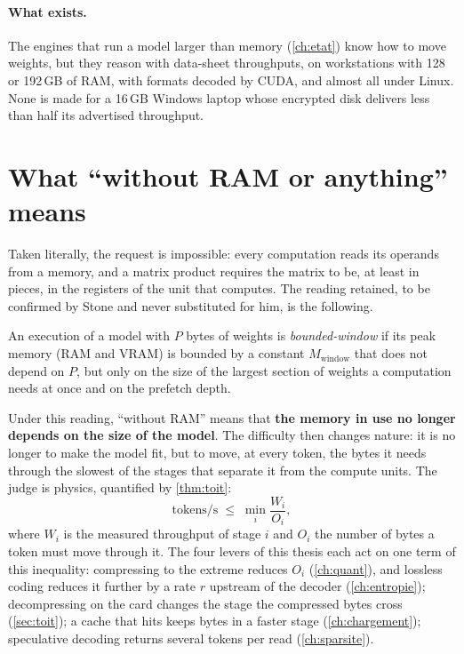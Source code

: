 \paragraph{What exists.} The engines that run a model larger than memory (\cref{ch:etat}) know how to move weights, but they reason with data-sheet throughputs, on workstations with 128 or 192\,GB of RAM, with formats decoded by CUDA, and almost all under Linux. None is made for a 16\,GB Windows laptop whose encrypted disk delivers less than half its advertised throughput.

\section{What \enquote{without RAM or anything} means}\label{sec:lecture}

Taken literally, the request is impossible: every computation reads its operands from a memory, and a matrix product requires the matrix to be, at least in pieces, in the registers of the unit that computes. The reading retained, to be confirmed by Stone and never substituted for him, is the following.

\begin{definition}\label{def:fenetre}
An execution of a model with $P$ bytes of weights is \emph{bounded-window} if its peak memory (RAM and VRAM) is bounded by a constant $M_{\text{window}}$ that does not depend on $P$, but only on the size of the largest section of weights a computation needs at once and on the prefetch depth.
\end{definition}

Under this reading, \enquote{without RAM} means that \textbf{the memory in use no longer depends on the size of the model}. The difficulty then changes nature: it is no longer to make the model fit, but to move, at every token, the bytes it needs through the slowest of the stages that separate it from the compute units. The judge is physics, quantified by \cref{thm:toit}:
\[
\text{tokens/s} \;\le\; \min_i \frac{W_i}{O_i},
\]
where $W_i$ is the measured throughput of stage $i$ and $O_i$ the number of bytes a token must move through it. The four levers of this thesis each act on one term of this inequality: compressing to the extreme reduces $O_i$ (\cref{ch:quant}), and lossless coding reduces it further by a rate $r$ upstream of the decoder (\cref{ch:entropie}); decompressing on the card changes the stage the compressed bytes cross (\cref{sec:toit}); a cache that hits keeps bytes in a faster stage (\cref{ch:chargement}); speculative decoding returns several tokens per read (\cref{ch:sparsite}).

